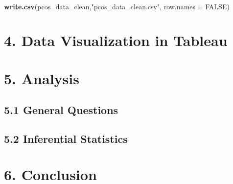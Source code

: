 \documentclass[
]{article}
\newenvironment{Shaded}{\begin{snugshade}}{\end{snugshade}}
\newcommand{\AttributeTok}[1]{\textcolor[rgb]{0.13,0.29,0.53}{#1}}
\newcommand{\ConstantTok}[1]{\textcolor[rgb]{0.56,0.35,0.01}{#1}}
\newcommand{\FunctionTok}[1]{\textcolor[rgb]{0.13,0.29,0.53}{\textbf{#1}}}
\newcommand{\NormalTok}[1]{#1}
\newcommand{\StringTok}[1]{\textcolor[rgb]{0.31,0.60,0.02}{#1}}
\begin{document}
\begin{Shaded}
\begin{Highlighting}[]
\FunctionTok{write.csv}\NormalTok{(pcos\_data\_clean,}\StringTok{"pcos\_data\_clean.csv"}\NormalTok{, }\AttributeTok{row.names =} \ConstantTok{FALSE}\NormalTok{)}
\end{Highlighting}
\end{Shaded}

\section{4. Data Visualization in
Tableau}\label{data-visualization-in-tableau}

\section{5. Analysis}\label{analysis}

\subsection{5.1 General Questions}\label{general-questions}

\subsection{5.2 Inferential Statistics}\label{inferential-statistics}

\section{6. Conclusion}\label{conclusion}
\end{document}
